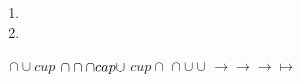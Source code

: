 \(  \)
\begin{enumerate}
  \item 
  \item 
\end{enumerate}
\(  \)
\(  \)
\( \cap \cup cup \)
\( \cap \cap \cap \\cap \cup \)
\( cup \cap \)
\( \cap \cup \cup \)
\( \to \to \to \mapsto \)
